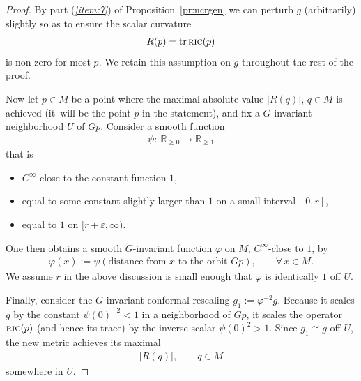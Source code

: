 \documentclass[pdftex]{sigma}%
\numberwithin{equation}{section}
\newcommand{\cat}[1]{\textsc{#1}}
\begin{document}
\begin{proof}
 By part ({\it \ref{item:7}}) of Proposition~\ref{pr:ncrgen} we can perturb $g$ (arbitrarily) slightly so as to ensure the scalar curvature
 \begin{gather*}
 R(p) = \operatorname{tr} \cat{ric}(p)
 \end{gather*}
 is non-zero for most $p$. We retain this assumption on $g$ throughout the rest of the proof.

 Now let $p\in M$ be a point where the maximal absolute value $|R(q)|$, $q\in M$ is achieved (it~will be the point $p$ in the statement), and fix a $G$-invariant neighborhood $U$ of $Gp$. %
 Consider a smooth function
 \begin{gather*}
 \psi\colon\ \mathbb{R}_{\ge 0}\to \mathbb{R}_{\ge 1}
 \end{gather*}
 that is
 \begin{itemize}\itemsep=0pt
 \item $C^{\infty}$-close to the constant function $1$,
 \item equal to some constant slightly larger than $1$ on a small interval $[0,r]$,
 \item equal to $1$ on $[r+\varepsilon,\infty)$.
 \end{itemize}
 One then obtains a smooth $G$-invariant function $\varphi$ on $M$, $C^{\infty}$-close to $1$, by
 \begin{gather*}
 \varphi(x):=\psi(\text{distance from $x$ to the orbit $Gp$}),\qquad \forall\, x\in M.
 \end{gather*}
 We assume $r$ in the above discussion is small enough that $\varphi$ is identically $1$ off $U$.

 Finally, consider the $G$-invariant conformal rescaling $g_1:=\varphi^{-2} g$. Because it scales $g$ by the constant $\psi(0)^{-2}<1$ in a neighborhood of $Gp$, it scales the operator $\cat{ric}(p)$ (and hence its trace) by the inverse scalar $\psi(0)^2>1$. Since $g_1\cong g$ off $U$, the new metric achieves its maximal
 \begin{gather}\label{eq:sprric}
 |R(q)|,\qquad q\in M
 \end{gather}
 somewhere in $U$.


\end{proof}
\end{document}
